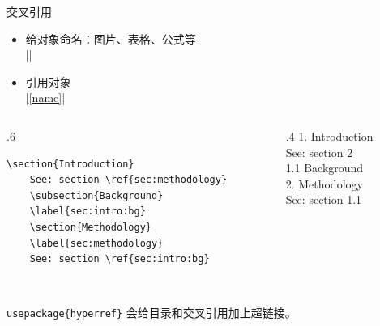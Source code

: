 \begin{frame}[fragile]{交叉引用}
      \begin{itemize}
      \item 给对象命名：图片、表格、公式等\\
      |\label{name}|
    \item 引用对象\\
      |\ref{name}|
      \end{itemize}
    \bigskip
    \begin{columns}
    \begin{column}{.6\textwidth}
    
    \begin{lstlisting}[basicstyle=\ttfamily\small]
    \section{Introduction}
    See: section \ref{sec:methodology}
    \subsection{Background}
    \label{sec:intro:bg}
    \section{Methodology}
    \label{sec:methodology}
    See: section \ref{sec:intro:bg}
    \end{lstlisting}
    \end{column}
    \begin{column}{.4\textwidth}
    1. Introduction \\
    See: section 2 \\
    1.1 Background \\
    2. Methodology \\
    See: section 1.1
    \end{column}
    \end{columns}

    \texttt{\\usepackage\{hyperref\}} 会给目录和交叉引用加上超链接。
    
    \end{frame}
    
